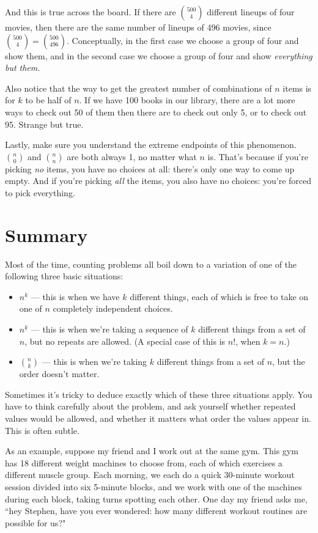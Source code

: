 And this is true across the board. If there are $\binom{500}{4}$ different
lineups of four movies, then there are the same number of lineups of 496
movies, since $\binom{500}{4} = \binom{500}{496}$. Conceptually, in the
first case we choose a group of four and show them, and in the second case
we choose a group of four and show \textit{everything but them.} 

Also notice that the way to get the greatest number of combinations of $n$
items is for $k$ to be half of $n$. If we have 100 books in our library,
there are a lot more ways to check out 50 of them then there are to check
out only 5, or to check out 95. Strange but true.

Lastly, make sure you understand the extreme endpoints of this phenomenon.
$\binom{n}{0}$ and $\binom{n}{n}$ are both always 1, no matter what
$n$ is. That's because if you're picking \textit{no} items, you have no
choices at all: there's only one way to come up empty. And if you're
picking \textit{all} the items, you also have no choices: you're forced to
pick everything.

\section{Summary}

Most of the time, counting problems all boil down to a variation of one of
the following three basic situations:

\begin{itemize}
\item $n^k$ --- this is when we have $k$ different things, each of which
is free to take on one of $n$ completely independent choices.
\item $n^{\underline{k}}$ --- this is when we're taking a sequence of $k$
different things from a set of $n$, but no repeats are allowed. (A special
case of this is $n!$, when $k=n$.)
\item $\binom{n}{k}$ --- this is when we're taking $k$ different things
from a set of $n$, but the order doesn't matter.
\end{itemize}

Sometimes it's tricky to deduce exactly which of these three situations
apply. You have to think carefully about the problem, and ask yourself
whether repeated values would be allowed, and whether it matters what order
the values appear in. This is often subtle.

As an example, suppose my friend and I work out at the same gym. This gym
has 18 different weight machines to choose from, each of which exercises a
different muscle group. Each morning, we each do a quick 30-minute workout
session divided into six 5-minute blocks, and we work with one of the
machines during each block, taking turns spotting each other. One day my
friend asks me, ``hey Stephen, have you ever wondered: how many different
workout routines are possible for us?"

